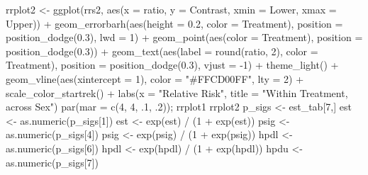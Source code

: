 \documentclass[12pt]{article}
\newenvironment{Shaded}{\begin{snugshade}}{\end{snugshade}}
\newcommand{\AttributeTok}[1]{\textcolor[rgb]{0.77,0.63,0.00}{#1}}
\newcommand{\DecValTok}[1]{\textcolor[rgb]{0.00,0.00,0.81}{#1}}
\newcommand{\FloatTok}[1]{\textcolor[rgb]{0.00,0.00,0.81}{#1}}
\newcommand{\FunctionTok}[1]{\textcolor[rgb]{0.00,0.00,0.00}{#1}}
\newcommand{\NormalTok}[1]{#1}
\newcommand{\OtherTok}[1]{\textcolor[rgb]{0.56,0.35,0.01}{#1}}
\newcommand{\SpecialCharTok}[1]{\textcolor[rgb]{0.00,0.00,0.00}{#1}}
\newcommand{\StringTok}[1]{\textcolor[rgb]{0.31,0.60,0.02}{#1}}
\begin{document}
\begin{Shaded}
\begin{Highlighting}[]
\NormalTok{rrplot2 }\OtherTok{\textless{}{-}} \FunctionTok{ggplot}\NormalTok{(rrs2, }\FunctionTok{aes}\NormalTok{(}\AttributeTok{x =}\NormalTok{ ratio, }\AttributeTok{y =}\NormalTok{ Contrast, }\AttributeTok{xmin =}\NormalTok{ Lower, }\AttributeTok{xmax =}\NormalTok{ Upper)) }\SpecialCharTok{+}
  \FunctionTok{geom\_errorbarh}\NormalTok{(}\FunctionTok{aes}\NormalTok{(}\AttributeTok{height =} \FloatTok{0.2}\NormalTok{, }\AttributeTok{color =}\NormalTok{ Treatment),}
                 \AttributeTok{position =} \FunctionTok{position\_dodge}\NormalTok{(}\FloatTok{0.3}\NormalTok{), }\AttributeTok{lwd =} \DecValTok{1}\NormalTok{) }\SpecialCharTok{+}
  \FunctionTok{geom\_point}\NormalTok{(}\FunctionTok{aes}\NormalTok{(}\AttributeTok{color =}\NormalTok{ Treatment), }\AttributeTok{position =} \FunctionTok{position\_dodge}\NormalTok{(}\FloatTok{0.3}\NormalTok{)) }\SpecialCharTok{+}
  \FunctionTok{geom\_text}\NormalTok{(}\FunctionTok{aes}\NormalTok{(}\AttributeTok{label =} \FunctionTok{round}\NormalTok{(ratio, }\DecValTok{2}\NormalTok{), }\AttributeTok{color =}\NormalTok{ Treatment), }
            \AttributeTok{position =} \FunctionTok{position\_dodge}\NormalTok{(}\FloatTok{0.3}\NormalTok{), }\AttributeTok{vjust =} \SpecialCharTok{{-}}\DecValTok{1}\NormalTok{) }\SpecialCharTok{+}
  \FunctionTok{theme\_light}\NormalTok{() }\SpecialCharTok{+}
  \FunctionTok{geom\_vline}\NormalTok{(}\FunctionTok{aes}\NormalTok{(}\AttributeTok{xintercept =} \DecValTok{1}\NormalTok{), }\AttributeTok{color =} \StringTok{"\#FFCD00FF"}\NormalTok{, }\AttributeTok{lty =} \DecValTok{2}\NormalTok{) }\SpecialCharTok{+}
  \FunctionTok{scale\_color\_startrek}\NormalTok{() }\SpecialCharTok{+}
  \FunctionTok{labs}\NormalTok{(}\AttributeTok{x =} \StringTok{"Relative Risk"}\NormalTok{, }\AttributeTok{title =} \StringTok{"Within Treatment, across Sex"}\NormalTok{)}
\FunctionTok{par}\NormalTok{(}\AttributeTok{mar =} \FunctionTok{c}\NormalTok{(}\DecValTok{4}\NormalTok{, }\DecValTok{4}\NormalTok{, .}\DecValTok{1}\NormalTok{, .}\DecValTok{2}\NormalTok{));}
\NormalTok{rrplot1}
\NormalTok{rrplot2}
\NormalTok{p\_sigs }\OtherTok{\textless{}{-}}\NormalTok{ est\_tab[}\DecValTok{7}\NormalTok{,]}
\NormalTok{est }\OtherTok{\textless{}{-}} \FunctionTok{as.numeric}\NormalTok{(p\_sigs[}\DecValTok{1}\NormalTok{])}
\NormalTok{est }\OtherTok{\textless{}{-}} \FunctionTok{exp}\NormalTok{(est) }\SpecialCharTok{/}\NormalTok{ (}\DecValTok{1} \SpecialCharTok{+} \FunctionTok{exp}\NormalTok{(est))}
\NormalTok{psig }\OtherTok{\textless{}{-}} \FunctionTok{as.numeric}\NormalTok{(p\_sigs[}\DecValTok{4}\NormalTok{])}
\NormalTok{psig }\OtherTok{\textless{}{-}} \FunctionTok{exp}\NormalTok{(psig) }\SpecialCharTok{/}\NormalTok{ (}\DecValTok{1} \SpecialCharTok{+} \FunctionTok{exp}\NormalTok{(psig))}
\NormalTok{hpdl }\OtherTok{\textless{}{-}} \FunctionTok{as.numeric}\NormalTok{(p\_sigs[}\DecValTok{6}\NormalTok{])}
\NormalTok{hpdl }\OtherTok{\textless{}{-}} \FunctionTok{exp}\NormalTok{(hpdl) }\SpecialCharTok{/}\NormalTok{ (}\DecValTok{1} \SpecialCharTok{+} \FunctionTok{exp}\NormalTok{(hpdl))}
\NormalTok{hpdu }\OtherTok{\textless{}{-}} \FunctionTok{as.numeric}\NormalTok{(p\_sigs[}\DecValTok{7}\NormalTok{])}


\end{Highlighting}
\end{Shaded}
\end{document}
